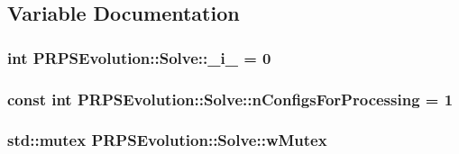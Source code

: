 \subsection{\-Variable \-Documentation}
\hypertarget{namespace_p_r_p_s_evolution_1_1_solve_ad8dbcbee23628608abd3af64b87e06d1}{
\subsubsection[{\-\_\-i\-\_\-}]{\setlength{\rightskip}{0pt plus 5cm}int {\bf \-P\-R\-P\-S\-Evolution\-::\-Solve\-::\-\_\-i\-\_\-} = 0}}\label{namespace_p_r_p_s_evolution_1_1_solve_ad8dbcbee23628608abd3af64b87e06d1}
\hypertarget{namespace_p_r_p_s_evolution_1_1_solve_a0a0db6d4ef7ce0baa2b7e184b20873f8}{
\subsubsection[{n\-Configs\-For\-Processing}]{\setlength{\rightskip}{0pt plus 5cm}const int {\bf \-P\-R\-P\-S\-Evolution\-::\-Solve\-::n\-Configs\-For\-Processing} = 1}}\label{namespace_p_r_p_s_evolution_1_1_solve_a0a0db6d4ef7ce0baa2b7e184b20873f8}
\hypertarget{namespace_p_r_p_s_evolution_1_1_solve_acfd9153e49dded44fda3314a7712fb4a}{
\subsubsection[{w\-Mutex}]{\setlength{\rightskip}{0pt plus 5cm}std\-::mutex {\bf \-P\-R\-P\-S\-Evolution\-::\-Solve\-::w\-Mutex}}}\label{namespace_p_r_p_s_evolution_1_1_solve_acfd9153e49dded44fda3314a7712fb4a}
